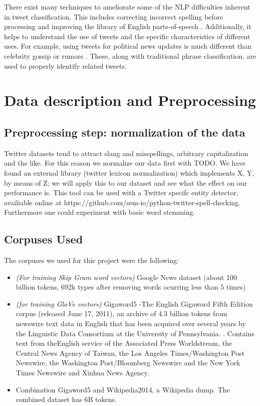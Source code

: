 \documentclass[conference]{IEEEtran}
\begin{document}
There exist many techniques to ameliorate some of the NLP difficulties inherent in tweet classification. This includes correcting incorrect spelling before processing and improving the library of English parts-of-speech \cite{derczynski}. Additionally, it helps to understand the use of tweets and the specific characteristics of different uses. For example, using tweets for political news updates is much different than celebrity gossip or rumors \cite{OConnor}. These, along with traditional phrase classification, are used to properly identify related tweets. 

\section{Data description and Preprocessing}


\subsection{Preprocessing step: normalization of the data}
Twitter datasets tend to attract slang and misspellings, arbitrary capitalization and the like.  For this reason we normalize our data first with TODO.  We have found an external library (twitter lexicon normalization) which implements X, Y, by means of Z; we will apply this to our dataset and see what the effect on our performance is.  This tool can be used with a Twitter specifc entity detector, availiable online at https://github.com/sem-io/python-twitter-spell-checking. Furthermore one could experiment with basic word stemming.  



\subsection{Corpuses Used}
The corpuses we used for thie project were the following:
\begin{itemize}
\item \textit{(For training Skip Gram word vectors)} Google News dataset (about 100 billion tokens, 692k types after removing words ocurring less than 5 times)

\item \textit{(for training GloVe vectors)} Gigaword5 -The English Gigaword Fifth Edition corpus (released June 17, 2011), an archive of 4.3 billion tokens from newswire text data in English that has been acquired over several years by the Linguistic Data Consortium at the University of Pennsylvania.  \cite{GloVe} \cite{Gigaword}.  Contains text from theEnglish service of the Associated Press Worldstream, the Central News Agency of Taiwan, the Los Angeles Times/Washington Post Newswire, the Washington Post/Bloomberg Newswire and the New York Times Newswire and Xinhua News Agency.

\item Combination Gigaword5 and Wikipedia2014, a Wikipedia dump.  The combined dataset has 6B tokens.

\end{itemize}
\end{document}
